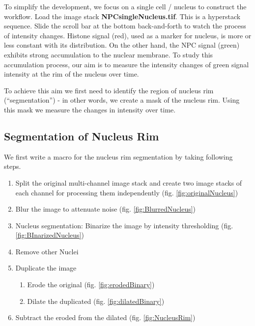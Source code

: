 To simplify the development, we focus on a single cell / nucleus to construct the workflow. Load the image stack \textbf{NPCsingleNucleus.tif}. This is a hyperstack sequence. Slide the scroll bar at the bottom back-and-forth to watch the process of intensity changes. Histone signal (red), used as a marker for nucleus, is more or less constant with its distribution. On the other hand, the NPC signal (green) exhibits strong accumulation to the nuclear membrane. To study this accumulation process, our aim is to measure the intensity changes of green signal intensity at the rim of the nucleus over time.

To achieve this aim we first need to identify the region of nucleus rim (``segmentation'') - in other words, we create a mask of the nucleus rim. Using this mask we measure the changes in intensity over time. 

\subsection{Segmentation of Nucleus Rim}

We first write a macro for the nucleus rim segmentation by taking following steps.  

\begin{enumerate}
  \item Split the original multi-channel image stack and create two image stacks of each channel for processing them independently (fig. \ref{fig:originalNucleus})
  \item Blur the image to attenuate noise (fig. \ref{fig:BlurredNucleus})
    \item Nucleus segmentation: Binarize the image by intensity thresholding  (fig. \ref{fig:BInarizedNucleus})
    \item Remove other Nuclei
    \item Duplicate the image
    \begin{enumerate}
        \item Erode the original (fig. \ref{fig:erodedBinary})

        \item Dilate the duplicated (fig. \ref{fig:dilatedBinary})

    \end{enumerate}
    \item Subtract the eroded from the dilated (fig. \ref{fig:NucleusRim})

\end{enumerate}

